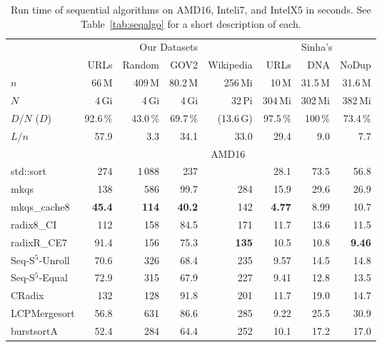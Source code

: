 \documentclass[a4paper]{myjournal}
\begin{document}
\begin{table}[p]\centering\small
\caption{Run time of sequential algorithms on AMD16, Inteli7, and IntelX5 in seconds. See Table~\ref{tab:seqalgo} for a short description of each.}\label{tab:seqalgo-results2}
\def\tabcolsep{6pt}
\begin{tabular}{l|rrrr rrr|}
                    & \multicolumn{4}{c|}{Our Datasets} & \multicolumn{3}{c|}{Sinha's} \\
                    & URLs     & Random   & GOV2     & \multicolumn{1}{r|}{Wikipedia} & URLs     & DNA     & NoDup    \\ \hline
$n$                 & 66\,M    & 409\,M   & 80.2\,M  & 256\,Mi   & 10\,M        & 31.5\,M & 31.6\,M  \\
$N$                 & 4\,Gi    & 4\,Gi    & 4\,Gi    & 32\,Pi    & 304\,Mi      & 302\,Mi & 382\,Mi  \\
$D / N$ ($D$)       & 92.6\,\% & 43.0\,\% & 69.7\,\% & (13.6\,G) & 97.5\,\%     & 100\,\% & 73.4\,\% \\
$L / n$             & 57.9     & 3.3      & 34.1     & 33.0      & 29.4         & 9.0     & 7.7      \\ \hline
& \multicolumn{7}{c|}{AMD16} \\ \cline{2-8}
std::sort &      274 &  1\,088 &      237 &         &     28.1 &     73.5 &     56.8 \\
            mkqs &      138 &     586 &     99.7 &     284 &     15.9 &     29.6 &     26.9 \\
    mkqs\_cache8 & \bf 45.4 & \bf 114 & \bf 40.2 &     142 & \bf 4.77 &     8.99 &     10.7 \\
      radix8\_CI &      112 &     158 &     84.5 &     171 &     11.7 &     13.6 &     11.5 \\
     radixR\_CE7 &     91.4 &     156 &     75.3 & \bf 135 &     10.5 &     10.8 & \bf 9.46 \\
Seq-S$^5$-Unroll &     70.6 &     326 &     68.4 &     235 &     9.57 &     14.5 &     14.8 \\
 Seq-S$^5$-Equal &     72.9 &     315 &     67.9 &     227 &     9.41 &     12.8 &     13.5 \\
          CRadix &      132 &     128 &     91.8 &     201 &     11.7 &     19.0 &     14.7 \\
    LCPMergesort &     56.8 &     631 &     86.6 &     285 &     9.22 &     25.5 &     30.9 \\
      burstsortA &     52.4 &     284 &     64.4 &     252 &     10.1 &     17.2 &     17.0 \\

\end{tabular}
\end{table}
\end{document}
